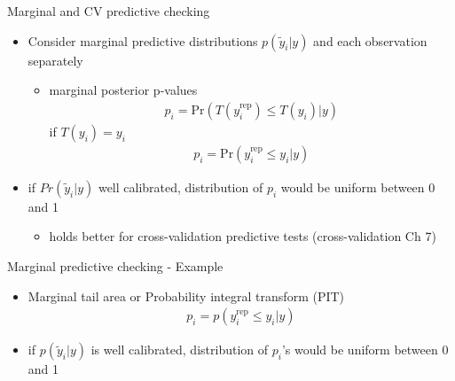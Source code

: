 \documentclass[t]{beamer}
\DeclareMathOperator{\rep}{\mathrm{rep}}
\begin{document}

\begin{frame}[fragile]

  {\Large\color{navyblue} Marginal and CV predictive checking}

  \begin{itemize}
  \item Consider marginal predictive distributions $p(\tilde{y}_i|y)$
    and each observation separately
    \begin{itemize}
    \item marginal posterior p-values
      \begin{align*}
        p_i = \mbox{Pr}(T(y_i^{\rep}) \leq T(y_i) | y)
      \end{align*}
      if $T(y_i)=y_i$
      \begin{align*}
        p_i = \mbox{Pr}(y_i^{\rep} \leq y_i | y)
      \end{align*}
    \end{itemize}
  \item<2-> if $Pr(\tilde{y}_i|y)$ well calibrated, distribution of $p_i$
    would be uniform between 0 and 1
    \begin{itemize}
    \item holds better for cross-validation predictive tests
      (cross-validation Ch 7) 
    \end{itemize}
  \end{itemize}

\end{frame}

\begin{frame}[fragile]

  {\Large\color{navyblue} Marginal predictive checking - Example}

  \begin{itemize}
  \item Marginal tail area or Probability integral transform (PIT)
    \begin{align*}
      p_i = p(y_i^{\rep} \leq y_i | y)
    \end{align*}
  \item if $p(\tilde{y}_i|y)$ is well calibrated, distribution of $p_i$'s
    would be uniform between 0 and 1
  \end{itemize}
  \vspace{-1.5\baselineskip}

\end{frame}
\end{document}
